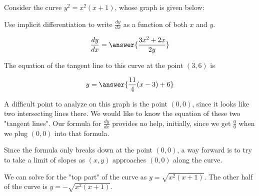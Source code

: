 \documentclass{ximera}
\author{Steven Gubkin}
\begin{document}
\begin{exercise}


Consider the curve  $y^2 = x^2(x+1)$, whose graph is given below:

\begin{image}
\end{image}

Use implicit differentiation to write $\frac{dy}{dx}$ as a function of both $x$ and $y$.

$$
\frac{dy}{dx} = \answer{\frac{3x^2+2x}{2y}}
$$

The equation of the tangent line to this curve at the point $(3,6)$ is

$$
y = \answer{\frac{11}{4}(x-3)+6}
$$

A difficult point to analyze on this graph is the point $(0,0)$, since it looks like two intersecting lines there.  We would like to know the equation of these two "tangent lines".  Our formula for $\frac{dy}{dx}$ provides no help, initially, since we get $\frac{0}{0}$ when we plug $(0,0)$ into that formula.

Since the formula only breaks down at the point $(0,0)$, a way forward is to try to take a limit of slopes as $(x,y)$ approaches $(0,0)$ along the curve.

We can solve for the "top part" of the curve as $y = \sqrt{x^2(x+1)}$.  The other half of the curve is $y  = -\sqrt{x^2(x+1)}$.


\end{exercise}
\end{document}
